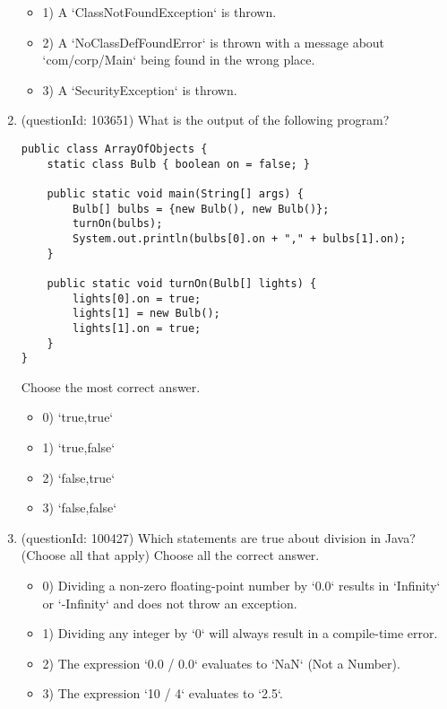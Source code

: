 \documentclass[12pt]{article}
\begin{document}
\begin{enumerate}[label=(\arabic*)]
\begin{itemize}
\item 1) A `ClassNotFoundException` is thrown.

\item 2) A `NoClassDefFoundError` is thrown with a message about `com/corp/Main` being found in the wrong place.

\item 3) A `SecurityException` is thrown.

\end{itemize}
\item (questionId: 103651) What is the output of the following program?
\begin{verbatim}
public class ArrayOfObjects {
    static class Bulb { boolean on = false; }

    public static void main(String[] args) {
        Bulb[] bulbs = {new Bulb(), new Bulb()};
        turnOn(bulbs);
        System.out.println(bulbs[0].on + "," + bulbs[1].on);
    }

    public static void turnOn(Bulb[] lights) {
        lights[0].on = true;
        lights[1] = new Bulb();
        lights[1].on = true;
    }
}
\end{verbatim}
Choose the most correct answer. 
\begin{itemize}
\item 0) `true,true`

\item 1) `true,false`

\item 2) `false,true`

\item 3) `false,false`

\end{itemize}
\item (questionId: 100427) Which statements are true about division in Java? (Choose all that apply)
Choose all the correct answer.\begin{itemize}
\item 0) Dividing a non-zero floating-point number by `0.0` results in `Infinity` or `-Infinity` and does not throw an exception.

\item 1) Dividing any integer by `0` will always result in a compile-time error.

\item 2) The expression `0.0 / 0.0` evaluates to `NaN` (Not a Number).

\item 3) The expression `10 / 4` evaluates to `2.5`.


\end{itemize}
\end{enumerate}
\end{document}
